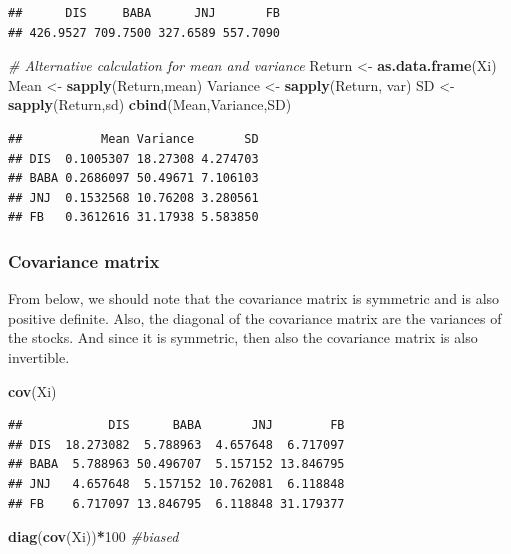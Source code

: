 \documentclass[]{article}
\newenvironment{Shaded}{\begin{snugshade}}{\end{snugshade}}
\newcommand{\KeywordTok}[1]{\textcolor[rgb]{0.13,0.29,0.53}{\textbf{#1}}}
\newcommand{\DecValTok}[1]{\textcolor[rgb]{0.00,0.00,0.81}{#1}}
\newcommand{\StringTok}[1]{\textcolor[rgb]{0.31,0.60,0.02}{#1}}
\newcommand{\CommentTok}[1]{\textcolor[rgb]{0.56,0.35,0.01}{\textit{#1}}}
\newcommand{\OperatorTok}[1]{\textcolor[rgb]{0.81,0.36,0.00}{\textbf{#1}}}
\newcommand{\NormalTok}[1]{#1}
\begin{document}
\begin{verbatim}
##      DIS     BABA      JNJ       FB 
## 426.9527 709.7500 327.6589 557.7090
\end{verbatim}

\begin{Shaded}
\begin{Highlighting}[]
\CommentTok{# Alternative calculation for mean and variance}
\NormalTok{Return <-}\StringTok{ }\KeywordTok{as.data.frame}\NormalTok{(Xi)}
\NormalTok{Mean <-}\StringTok{ }\KeywordTok{sapply}\NormalTok{(Return,mean)}
\NormalTok{Variance <-}\StringTok{ }\KeywordTok{sapply}\NormalTok{(Return, var)}
\NormalTok{SD <-}\StringTok{ }\KeywordTok{sapply}\NormalTok{(Return,sd)}
\KeywordTok{cbind}\NormalTok{(Mean,Variance,SD)}
\end{Highlighting}
\end{Shaded}

\begin{verbatim}
##           Mean Variance       SD
## DIS  0.1005307 18.27308 4.274703
## BABA 0.2686097 50.49671 7.106103
## JNJ  0.1532568 10.76208 3.280561
## FB   0.3612616 31.17938 5.583850
\end{verbatim}

\subsubsection{Covariance matrix}\label{covariance-matrix}

From below, we should note that the covariance matrix is symmetric and
is also positive definite. Also, the diagonal of the covariance matrix
are the variances of the stocks. And since it is symmetric, then also
the covariance matrix is also invertible.

\begin{Shaded}
\begin{Highlighting}[]
\KeywordTok{cov}\NormalTok{(Xi)}
\end{Highlighting}
\end{Shaded}

\begin{verbatim}
##            DIS      BABA       JNJ        FB
## DIS  18.273082  5.788963  4.657648  6.717097
## BABA  5.788963 50.496707  5.157152 13.846795
## JNJ   4.657648  5.157152 10.762081  6.118848
## FB    6.717097 13.846795  6.118848 31.179377
\end{verbatim}

\begin{Shaded}
\begin{Highlighting}[]
\KeywordTok{diag}\NormalTok{(}\KeywordTok{cov}\NormalTok{(Xi))}\OperatorTok{*}\DecValTok{100} \CommentTok{#biased}
\end{Highlighting}
\end{Shaded}
\end{document}
